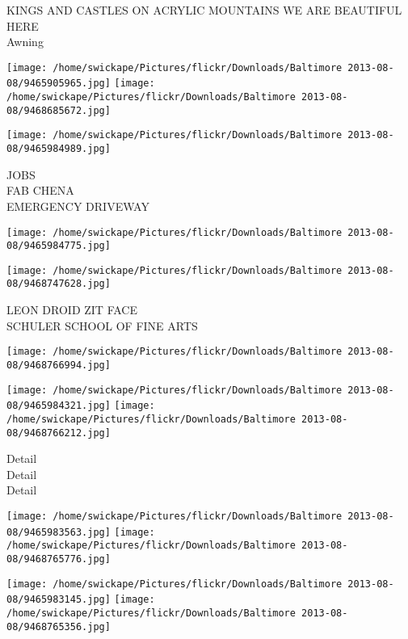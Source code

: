 \documentclass[10pt,letterpaper]{article}
\begin{document}
KINGS AND CASTLES ON ACRYLIC MOUNTAINS WE ARE BEAUTIFUL HERE\\
Awning\\
\pagebreak

\texttt{[image: /home/swickape/Pictures/flickr/Downloads/Baltimore 2013-08-08/9465905965.jpg]}
\texttt{[image: /home/swickape/Pictures/flickr/Downloads/Baltimore 2013-08-08/9468685672.jpg]}

\vspace{0.25in}
\texttt{[image: /home/swickape/Pictures/flickr/Downloads/Baltimore 2013-08-08/9465984989.jpg]}

JOBS\\
FAB CHENA\\
EMERGENCY DRIVEWAY\\
\pagebreak

\texttt{[image: /home/swickape/Pictures/flickr/Downloads/Baltimore 2013-08-08/9465984775.jpg]}

\vspace{0.25in}
\texttt{[image: /home/swickape/Pictures/flickr/Downloads/Baltimore 2013-08-08/9468747628.jpg]}

LEON DROID ZIT FACE\\
SCHULER SCHOOL OF FINE ARTS\\
\pagebreak

\texttt{[image: /home/swickape/Pictures/flickr/Downloads/Baltimore 2013-08-08/9468766994.jpg]}

\vspace{0.25in}
\texttt{[image: /home/swickape/Pictures/flickr/Downloads/Baltimore 2013-08-08/9465984321.jpg]}
\texttt{[image: /home/swickape/Pictures/flickr/Downloads/Baltimore 2013-08-08/9468766212.jpg]}

Detail\\
Detail\\
Detail\\
\pagebreak

\texttt{[image: /home/swickape/Pictures/flickr/Downloads/Baltimore 2013-08-08/9465983563.jpg]}
\texttt{[image: /home/swickape/Pictures/flickr/Downloads/Baltimore 2013-08-08/9468765776.jpg]}

\texttt{[image: /home/swickape/Pictures/flickr/Downloads/Baltimore 2013-08-08/9465983145.jpg]}
\texttt{[image: /home/swickape/Pictures/flickr/Downloads/Baltimore 2013-08-08/9468765356.jpg]}
\end{document}
